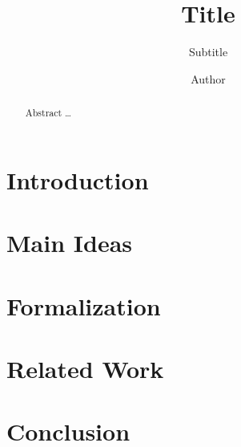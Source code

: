 \documentclass[acmsmall,nonacm=true,screen=true,timestamp=true]{acmart}
\begin{document}
\title{Title}
\subtitle{Subtitle}
\author{Author}

\begin{abstract}
  Abstract \ldots
\end{abstract}

\maketitle



\section{Introduction}
\label{sec:intro}


\section{Main Ideas}
\label{sec:mainideas}


\section{Formalization}
\label{sec:formalization}


\section{Related Work}
\label{sec:relatedwork}


\section{Conclusion}
\label{sec:conclusion}



\end{document}
